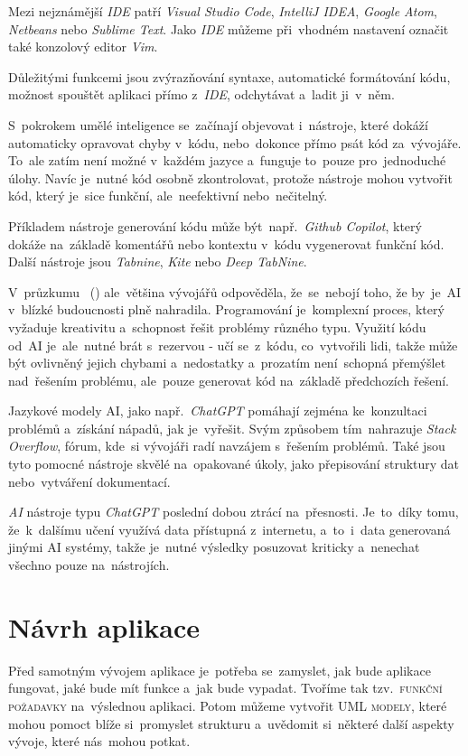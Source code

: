 \documentclass[14pt,a4paper]{article}
\begin{document}
        Mezi nejznámější \emph{IDE} patří \emph{Visual Studio Code}, \emph{IntelliJ IDEA}, \emph{Google Atom}, \emph{Netbeans} nebo \emph{Sublime Text}. Jako \emph{IDE} můžeme při~vhodném nastavení označit také konzolový editor \emph{Vim}.
        
        Důležitými funkcemi jsou zvýrazňování syntaxe, automatické formátování kódu, možnost spouštět aplikaci přímo z~\emph{IDE}, odchytávat a~ladit ji~v~něm. \cite{IDE}
        
        S~pokrokem umělé inteligence se~začínají objevovat i~nástroje, které dokáží automaticky opravovat chyby v~kódu, nebo~dokonce přímo psát kód za~vývojáře. To~ale zatím není možné v~každém jazyce a~funguje to~pouze pro~jednoduché úlohy. Navíc je~nutné kód osobně zkontrolovat, protože nástroje mohou vytvořit kód, který je~sice funkční, ale~neefektivní nebo~nečitelný.

        Příkladem nástroje generování kódu může být~např.~\emph{Github Copilot}, který dokáže na~základě komentářů nebo kontextu v~kódu vygenerovat funkční kód. Další nástroje jsou \emph{Tabnine}, \emph{Kite} nebo \emph{Deep TabNine}. \cite{sz:AI}
        
        V~průzkumu ~(\cite{zerotomasteryStateOfAI}) ale~většina vývojářů odpověděla, že~se~nebojí toho, že by~je~\textsc{AI} v~blízké budoucnosti plně nahradila. Programování je~komplexní proces, který vyžaduje kreativitu a~schopnost řešit problémy různého typu. Využití kódu od~\textsc{AI} je~ale~nutné brát s~rezervou - učí se~z~kódu, co~vytvořili lidi, takže může být ovlivněný jejich chybami a~nedostatky a~prozatím není~schopná přemýšlet nad~řešením problému, ale~pouze generovat kód na~základě předchozích řešení.
        
        Jazykové modely \textsc{AI}, jako např.~\emph{ChatGPT} pomáhají zejména ke~konzultaci problémů a~získání nápadů, jak je~vyřešit. Svým způsobem tím~nahrazuje \emph{Stack Overflow}, fórum, kde~si vývojáři radí navzájem s~řešením problémů. Také jsou tyto pomocné nástroje skvělé na~opakované úkoly, jako přepisování struktury dat nebo~vytváření dokumentací.

        \emph{AI} nástroje typu \emph{ChatGPT} poslední dobou ztrácí na~přesnosti. Je~to~díky tomu, že~k~dalšímu učení využívá data přístupná z~internetu, a~to~i~data generovaná jinými \textsc{AI} systémy, takže je~nutné výsledky posuzovat kriticky a~nenechat všechno pouze na~nástrojích.\cite{computerworld:AI}

	\section{Návrh aplikace}
        Před samotným vývojem aplikace je~potřeba se~zamyslet, jak bude aplikace fungovat, jaké bude mít funkce a~jak bude vypadat. Tvoříme tak tzv.~\textsc{funkční požadavky} na~výslednou aplikaci. Potom můžeme vytvořit \textsc{UML modely}, které mohou pomoct blíže si~promyslet strukturu a~uvědomit si~některé další aspekty vývoje, které nás~mohou potkat.
\end{document}
